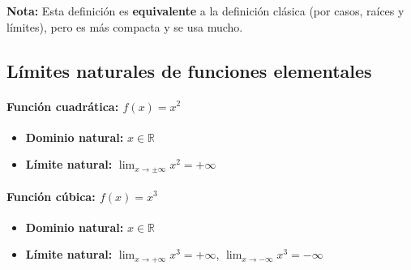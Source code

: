 \documentclass[12pt, a4paper]{article}
\theoremstyle{rioplatense}
\begin{document}
\begin{flushleft}
\textbf{Nota:}
Esta definición es \textbf{equivalente} a la definición clásica (por casos, raíces y límites), pero es más compacta y se usa mucho.
\end{flushleft}

\subsection{Límites naturales de funciones elementales}

\paragraph{Función cuadrática: \( f(x) = x^2 \)}
\begin{itemize}
    \item \textbf{Dominio natural:} \( x \in \mathbb{R} \)
    \item \textbf{Límite natural:} \( \lim_{x \to \pm\infty} x^2 = +\infty \)

\end{itemize}

\begin{center}
\end{center}

\paragraph{Función cúbica: \( f(x) = x^3 \)}
\begin{itemize}

\item \textbf{Dominio natural:} \( x \in \mathbb{R} \)

    \item \textbf{Límite natural:} \( \lim_{x \to +\infty} x^3 = +\infty \), \( \lim_{x \to -\infty} x^3 = -\infty \)
    
\end{itemize}
\end{document}
